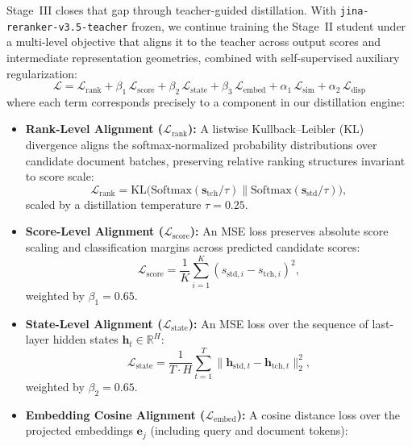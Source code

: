 \documentclass{article}
\newcommand{\jrrvthreefiveteacher}{\texttt{jina-reranker-v3.5-teacher}}
\begin{document}
Stage~III closes that gap through teacher-guided distillation. With \jrrvthreefiveteacher{} frozen, we continue training the Stage~II student under a multi-level objective that aligns it to the teacher across output scores and intermediate representation geometries, combined with self-supervised auxiliary regularization:
\begin{equation}
  \mathcal{L} = \mathcal{L}_{\mathrm{rank}} + \beta_{1}\,\mathcal{L}_{\mathrm{score}} + \beta_{2}\,\mathcal{L}_{\mathrm{state}} + \beta_{3}\,\mathcal{L}_{\mathrm{embed}} + \alpha_{1}\,\mathcal{L}_{\mathrm{sim}} + \alpha_{2}\,\mathcal{L}_{\mathrm{disp}}
\end{equation}
where each term corresponds precisely to a component in our distillation engine:
\begin{itemize}[leftmargin=*]
  \item \textbf{Rank-Level Alignment ($\mathcal{L}_{\mathrm{rank}}$):}
  A listwise Kullback--Leibler (KL) divergence aligns the softmax-normalized probability distributions over candidate document batches, preserving relative ranking structures invariant to score scale:
  \begin{equation}
    \mathcal{L}_{\mathrm{rank}} = \mathrm{KL}\bigl(\mathrm{Softmax}(\mathbf{s}_{\mathrm{tch}} / \tau) \parallel \mathrm{Softmax}(\mathbf{s}_{\mathrm{std}} / \tau)\bigr),
  \end{equation}
  scaled by a distillation temperature $\tau = 0.25$.
  \item \textbf{Score-Level Alignment ($\mathcal{L}_{\mathrm{score}}$):}
  An MSE loss preserves absolute score scaling and classification margins across predicted candidate scores:
  \begin{equation}
    \mathcal{L}_{\mathrm{score}} = \frac{1}{K} \sum_{i=1}^{K} (s_{\mathrm{std}, i} - s_{\mathrm{tch}, i})^2,
  \end{equation}
  weighted by $\beta_{1} = 0.65$.
  \item \textbf{State-Level Alignment ($\mathcal{L}_{\mathrm{state}}$):}
  An MSE loss over the sequence of last-layer hidden states $\mathbf{h}_t \in \mathbb{R}^H$:
  \begin{equation}
    \mathcal{L}_{\mathrm{state}} = \frac{1}{T \cdot H} \sum_{t=1}^{T} \lVert \mathbf{h}_{\mathrm{std}, t} - \mathbf{h}_{\mathrm{tch}, t} \rVert_2^2,
  \end{equation}
  weighted by $\beta_{2} = 0.65$.
  \item \textbf{Embedding Cosine Alignment ($\mathcal{L}_{\mathrm{embed}}$):}
  A cosine distance loss over the projected embeddings $\mathbf{e}_j$ (including query and document tokens):

\end{itemize}
\end{document}
